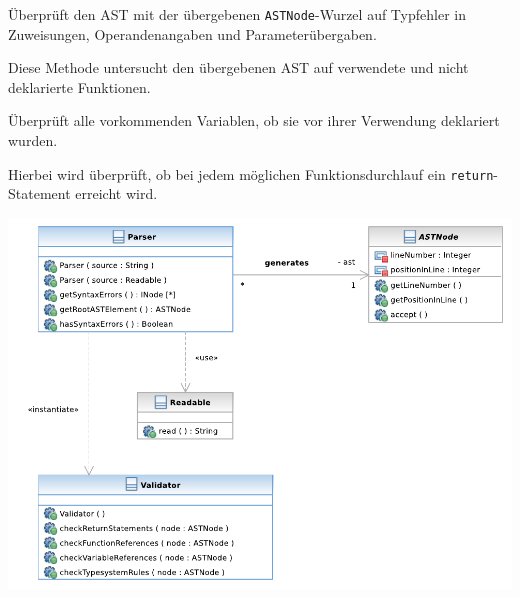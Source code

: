 \begin{description}
		Überprüft den AST mit der übergebenen \texttt{ASTNode}-Wurzel auf Typfehler in Zuweisungen, Operandenangaben und Parameterübergaben.

		Diese Methode untersucht den übergebenen AST auf verwendete und nicht deklarierte Funktionen.

		Überprüft alle vorkommenden Variablen, ob sie vor ihrer Verwendung deklariert wurden.

		Hierbei wird überprüft, ob bei jedem möglichen Funktionsdurchlauf ein \texttt{return}-Statement erreicht wird.

\end{description}

\includegraphics[width=\textwidth]{diagrams/parser_component.pdf}
